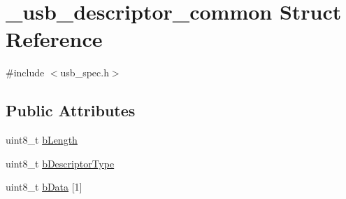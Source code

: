 \hypertarget{struct__usb__descriptor__common}{\section{\-\_\-usb\-\_\-descriptor\-\_\-common Struct Reference}
\label{struct__usb__descriptor__common}
}


{\ttfamily \#include $<$usb\-\_\-spec.\-h$>$}

\subsection*{Public Attributes}
\begin{DoxyCompactItemize}
\item 
uint8\-\_\-t \hyperlink{struct__usb__descriptor__common_a19a768e7c2bd7f71975e958a997696fc}{b\-Length}
\item 
uint8\-\_\-t \hyperlink{struct__usb__descriptor__common_a50af8e651a87939469875e0c25fdf085}{b\-Descriptor\-Type}
\item 
uint8\-\_\-t \hyperlink{struct__usb__descriptor__common_a8f30ceceee4ee72bbad44299e1e1fbca}{b\-Data} \mbox{[}1\mbox{]}
\end{DoxyCompactItemize}


